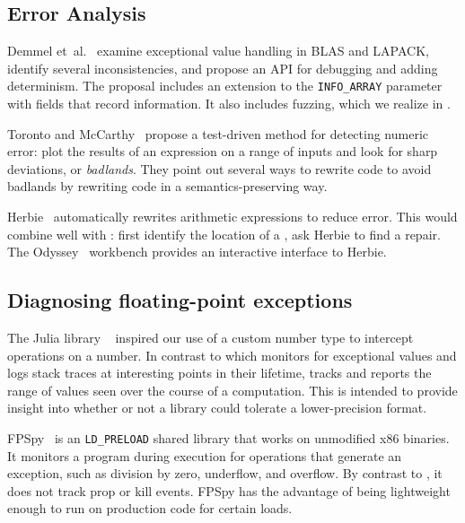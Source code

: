 \documentclass{juliacon}
\begin{document}
\subsection{Error Analysis}

Demmel et~al.~\cite{ddghlllprr-correctness-2022} examine \fp{} exceptional value handling in BLAS and LAPACK, identify several inconsistencies, and propose an API for debugging and adding determinism.
The proposal includes an extension to the \texttt{INFO\_ARRAY} parameter with fields that record \genpropkill{} information.
It also includes fuzzing, which we realize in \TF{}.

Toronto and McCarthy~\cite{torontoPracticallyAccurateFloatingPoint2014} propose a test-driven method for detecting numeric error: plot the results of an expression on a range of inputs and look for sharp deviations, or \emph{badlands}.
They point out several ways to rewrite code to avoid badlands by rewriting code in a semantics-preserving way.

Herbie~\cite{panchekhaAutomaticallyImprovingAccuracy2015} automatically rewrites arithmetic expressions to reduce \fp{} error.
This would combine well with \TF{}: first identify the location of a \NaN{}, ask Herbie to find a repair.
The Odyssey~\cite{misbackOdysseyInteractiveWorkbench2023} workbench provides an interactive interface to Herbie.


\subsection{Diagnosing floating-point exceptions}

The Julia library \Sherlogs{}~\cite{kMilanklSherlogsJl2021} inspired our use of a custom number type to intercept operations on a number.
In contrast to \TF{} which monitors for exceptional values and logs stack traces at interesting points in their lifetime, \Sherlogs{} tracks and reports the range of values seen over the course of a computation.
This is intended to provide insight into whether or not a library could tolerate a lower-precision \fp{} format.

FPSpy~\cite{dindaSpyingFloatingPoint2020} is an \texttt{LD\_PRELOAD} shared library that works on unmodified x86 binaries.
It monitors a program during execution for operations that generate an exception, such as division by zero, underflow, and overflow.
By contrast to \TF{}, it does not track prop or kill events.
FPSpy has the advantage of being lightweight enough to run on production code for certain loads.
\end{document}
